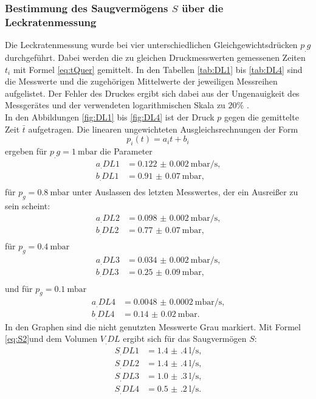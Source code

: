\subsubsection{Bestimmung des Saugvermögens $S$ über die Leckratenmessung}

Die Leckratenmessung wurde bei vier unterschiedlichen Gleichgewichtsdrücken $p_.g$ durchgeführt. Dabei werden die zu gleichen Druckmesswerten gemessenen Zeiten $t_i$ mit Formel \eqref{eq:tQuer} gemittelt.
In den Tabellen \ref{tab:DL1} bis \ref{tab:DL4} sind die Messwerte und die zugehörigen Mittelwerte der jeweiligen Messreihen aufgelistet. Der Fehler des Druckes ergibt sich dabei aus der Ungenauigkeit des Messgerätes und der verwendeten logarithmischen Skala zu $20\%$ \cite{V70}.\\
In den Abbildungen \ref{fig:DL1} bis \ref{fig:DL4} ist der Druck $p$ gegen die gemittelte Zeit $\bar{t}$ aufgetragen.
Die linearen ungewichteten Ausgleichsrechnungen der Form
\[
p_i(t) = a_it+b_i
\]
ergeben für $p_.g = \SI{1}{\milli\bar}$ die Parameter
\begin{align*}
a_.{DL1} &= \SI{0.122(2)}{\milli\bar\per\second} \text{,}\\
b_.{DL1} &= \SI{0.91(7)}{\milli\bar} \text{,}\\
\end{align*}
für $p_g = \SI{0.8}{\milli\bar}$ unter Auslassen des letzten Messwertes, der ein Ausreißer zu sein scheint:
\begin{align*}
a_.{DL2} &= \SI{0.098(2)}{\milli\bar\per\second} \text{,}\\
b_.{DL2} &= \SI{0.77(7)}{\milli\bar} \text{,}\\
\end{align*}
für $p_g = \SI{0.4}{\milli\bar}$
\begin{align*}
a_.{DL3} &= \SI{0.034(2)}{\milli\bar\per\second} \text{,}\\
b_.{DL3} &= \SI{0.25(9)}{\milli\bar} \text{,}\\
\end{align*}
und für $p_g = \SI{0.1}{\milli\bar}$
\begin{align*}
a_.{DL4} &= \SI{0.0048(2)}{\milli\bar\per\second} \text{,}\\
b_.{DL4} &= \SI{0.14(2)}{\milli\bar} \text{.}
\end{align*}
In den Graphen sind die nicht genutzten Messwerte Grau markiert.
Mit Formel \eqref{eq:S2}und dem Volumen $V_.{DL}$ ergibt sich für das Saugvermögen $S$:
\begin{align*}
S_.{DL1} &= \SI{1.4(4)}{\litre\per\second} \text{,}\\
S_.{DL2} &= \SI{1.4(4)}{\litre\per\second} \text{,}\\
S_.{DL3} &= \SI{1.0(3)}{\litre\per\second} \text{,}\\
S_.{DL4}   &= \SI{0.5(2)}{\litre\per\second} \text{.}
\end{align*}

